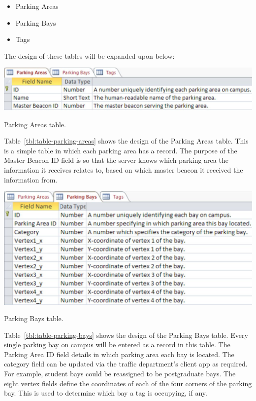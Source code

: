 \begin{itemize}
\item Parking Areas
\item Parking Bays
\item Tags
\end{itemize}

The design of these tables will be expanded upon below:


\begin{table}[H]
\begin{center}
\includegraphics[scale=0.5]{data/software/5.jpg}
\caption{Parking Areas table.}
\label{tbl:table-parking-areas}
\end{center}
\end{table}

Table~\ref{tbl:table-parking-areas} shows the design of the Parking Areas table. This is a simple table in which each parking area has a record. The purpose of the Master Beacon ID field is so that the server knows which parking area the information it receives relates to, based on which master beacon it received the information from.

\newpage
{}

\begin{table}[H]
\begin{center}
\includegraphics[scale=0.5]{data/software/6.jpg}
\caption{Parking Bays table.}
\label{tbl:table-parking-bays}
\end{center}
\end{table}

Table~\ref{tbl:table-parking-bays} shows the design of the Parking Bays table. Every single parking bay on campus will be entered as a record in this table. The Parking Area ID field details in which parking area each bay is located. The category field can be updated via the traffic department's client app as required. For example, student bays could be reassigned to be postgraduate bays. The eight vertex fields define the coordinates of each of the four corners of the parking bay. This is used to determine which bay a tag is occupying, if any.

